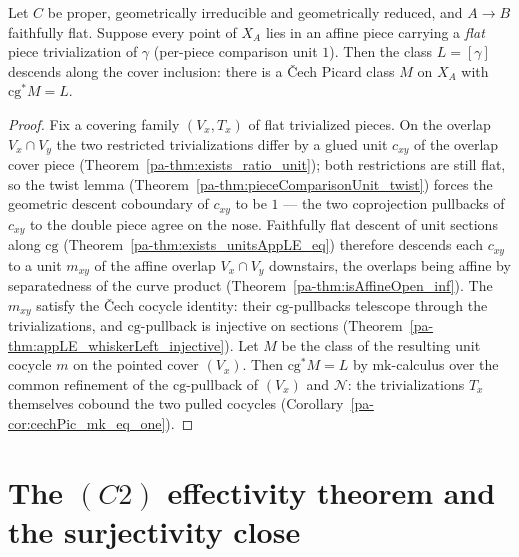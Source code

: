 \begin{theorem}
  \label{pa-thm:refinement_splice}
  \leanok

  Let \(C\) be proper, geometrically irreducible and geometrically reduced, and \(A \to B\)
  faithfully flat. Suppose every point of \(X_A\) lies in an affine piece carrying a \emph{flat}
  piece trivialization of \(\gamma\) (per-piece comparison unit \(1\)). Then the class \(L =
  [\gamma]\) descends along the cover inclusion: there is a \v Cech Picard class \(M\) on \(X_A\)
  with \(\mathrm{cg}^{*}M = L\).
\end{theorem}
\begin{proof}
  \leanok
  Fix a covering family \((V_x, T_x)\) of flat trivialized pieces. On the overlap \(V_x \cap V_y\)
  the two restricted trivializations differ by a glued unit \(c_{xy}\) of the overlap cover piece
  (Theorem~\ref{pa-thm:exists_ratio_unit}); both restrictions are still flat, so the twist lemma
  (Theorem~\ref{pa-thm:pieceComparisonUnit_twist}) forces the geometric descent coboundary of
  \(c_{xy}\) to be \(1\) --- the two coprojection pullbacks of \(c_{xy}\) to the double piece agree
  on the nose. Faithfully flat descent of unit sections along \(\mathrm{cg}\)
  (Theorem~\ref{pa-thm:exists_unitsAppLE_eq}) therefore descends each \(c_{xy}\) to a unit \(m_{xy}\) of
  the affine overlap \(V_x \cap V_y\) downstairs, the overlaps being affine by separatedness of the
  curve product (Theorem~\ref{pa-thm:isAffineOpen_inf}). The \(m_{xy}\) satisfy the \v Cech cocycle
  identity: their \(\mathrm{cg}\)-pullbacks telescope through the trivializations, and
  \(\mathrm{cg}\)-pullback is injective on sections (Theorem~\ref{pa-thm:appLE_whiskerLeft_injective}).
  Let \(M\) be the class of the resulting unit cocycle \(m\) on the pointed cover \((V_x)\). Then
  \(\mathrm{cg}^{*}M = L\) by \(\mathrm{mk}\)-calculus over the common refinement of the
  \(\mathrm{cg}\)-pullback of \((V_x)\) and \(\mathcal N\): the trivializations \(T_x\) themselves
  cobound the two pulled cocycles (Corollary~\ref{pa-cor:cechPic_mk_eq_one}).
\end{proof}

\section{The \((C2)\) effectivity theorem and the surjectivity close}
\label{pa-sec:effectivityClose}

